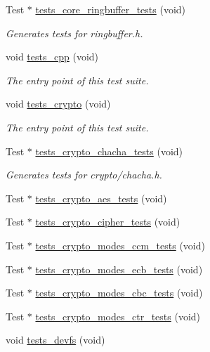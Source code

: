 \begin{DoxyCompactItemize}
Test $\ast$ \hyperlink{group__unittests_gafd9d608a22f7a35a7c85501b68bb0baf}{tests\+\_\+core\+\_\+ringbuffer\+\_\+tests} (void)
\begin{DoxyCompactList}\small\item\em Generates tests for ringbuffer.\+h. \end{DoxyCompactList}\item 
void \hyperlink{group__unittests_gaa3dd2eb88b82592a6fa7dd87aecd62b7}{tests\+\_\+cpp} (void)
\begin{DoxyCompactList}\small\item\em The entry point of this test suite. \end{DoxyCompactList}\item 
void \hyperlink{group__unittests_ga910f269e2fc5cd756415b49feb82eaca}{tests\+\_\+crypto} (void)
\begin{DoxyCompactList}\small\item\em The entry point of this test suite. \end{DoxyCompactList}\item 
Test $\ast$ \hyperlink{group__unittests_ga57ccd7e24b05012c775da48c9d521939}{tests\+\_\+crypto\+\_\+chacha\+\_\+tests} (void)
\begin{DoxyCompactList}\small\item\em Generates tests for crypto/chacha.\+h. \end{DoxyCompactList}\item 
Test $\ast$ \hyperlink{group__unittests_ga19bbedd30b2147c5418e225af2ce5d73}{tests\+\_\+crypto\+\_\+aes\+\_\+tests} (void)
\item 
Test $\ast$ \hyperlink{group__unittests_ga0da52ebef74d5bf263ce63858f7dea0c}{tests\+\_\+crypto\+\_\+cipher\+\_\+tests} (void)
\item 
Test $\ast$ \hyperlink{group__unittests_gadf1db8c6d373f13fccc185fdf2b43be6}{tests\+\_\+crypto\+\_\+modes\+\_\+ccm\+\_\+tests} (void)
\item 
Test $\ast$ \hyperlink{group__unittests_ga76fd240d06e873ffb3cd5e75c7407de8}{tests\+\_\+crypto\+\_\+modes\+\_\+ecb\+\_\+tests} (void)
\item 
Test $\ast$ \hyperlink{group__unittests_gada776e0b50a5f95f2f3eb86d94d83791}{tests\+\_\+crypto\+\_\+modes\+\_\+cbc\+\_\+tests} (void)
\item 
Test $\ast$ \hyperlink{group__unittests_ga504b19a263d14508528b1c378a3edee5}{tests\+\_\+crypto\+\_\+modes\+\_\+ctr\+\_\+tests} (void)
\item 
void \hyperlink{group__unittests_ga03275129153bd3a312c96576f1c15526}{tests\+\_\+devfs} (void)

\end{DoxyCompactItemize}
